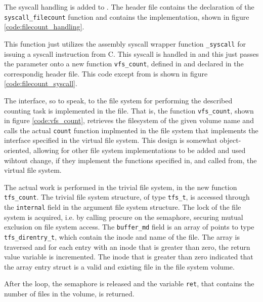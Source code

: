 The syscall handling is added to . The header file
contains the declaration of the \verb|syscall_filecount| function and
 contains the implementation, shown in figure
\ref{code:filecount_handling}.


This function just utilizes the assembly syscall wrapper function
\verb|_syscall| for issuing a syscall instruction from C. This syscall is
handled in  and this just passes the parameter onto a new
function \verb|vfs_count|, defined in  and declared in the
correspondig header file. This code except from  is shown
in figure \ref{code:filecount_syscall}.


The interface, so to speak, to the file system for performing the described
counting task is implemented in the  file. That is, the function
\verb|vfs_count|, shown in figure \ref{code:vfs_count}, retrieves the
filesystem of the given volume name and calls the actual \verb|count| function
implmented in the file system that implements the interface specified in the
virtual file system. This design is somewhat object-oriented, allowing for
other file system implementations to be added and used wihtout change, if they
implement the functions specified in, and called from, the virtual file system.


The actual work is performed in the trivial file system, in the new function
\verb|tfs_count|. The trivial file system structure, of type \verb|tfs_t|, is
accessed through the \verb|internal| field in the argument file system
structure. The lock of the file system is acquired, i.e. by calling procure on
the semaphore, securing mutual exclusion on file system access. The
\verb|buffer_md| field is an array of points to type \verb|tfs_direntry_t|,
which contain the inode and name of the file. The array is traversed and for
each entry with an inode that is greater than zero, the return value variable
is incremented. The inode that is greater than zero indicated that the array
entry struct is a valid and existing file in the file system volume.


After the loop, the semaphore is released and the variable \verb|ret|, that
contains the number of files in the volume, is returned.

